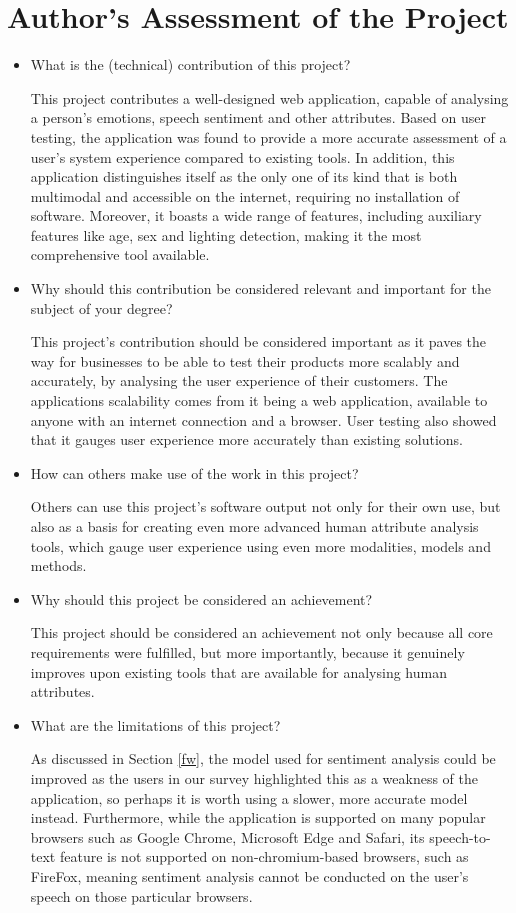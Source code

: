 \documentclass[12pt, a4paper]{article}
\newcommand{\np}
    {
    \vskip 0.4cm
    }
\begin{document}
\section{Author's Assessment of the Project}

\begin{itemize}
    \item What is the (technical) contribution of this project?
    \np
    This project contributes a well-designed web application, capable of analysing a person's emotions, speech sentiment and other attributes. Based on user testing, the application was found to provide a more accurate assessment of a user's system experience compared to existing tools. In addition, this application distinguishes itself as the only one of its kind that is both multimodal and accessible on the internet, requiring no installation of software. Moreover, it boasts a wide range of features, including auxiliary features like age, sex and lighting detection, making it the most comprehensive tool available.

    \item Why should this contribution be considered relevant and important for the subject of your degree?
    \np
    This project's contribution should be considered important as it paves the way for businesses to be able to test their products more scalably and accurately, by analysing the user experience of their customers. The applications scalability comes from it being a web application, available to anyone with an internet connection and a browser. User testing also showed that it gauges user experience more accurately than existing solutions.

    \item How can others make use of the work in this project?
    \np
    Others can use this project's software output not only for their own use, but also as a basis for creating even more advanced human attribute analysis tools, which gauge user experience using even more modalities, models and methods. 

    \item Why should this project be considered an achievement?
    \np
    This project should be considered an achievement not only because all core requirements were fulfilled, but more importantly, because it genuinely improves upon existing tools that are available for analysing human attributes.  
    
    \item What are the limitations of this project?
    \np
    As discussed in Section \ref{fw}, the model used for sentiment analysis could be improved as the users in our survey highlighted this as a weakness of the application, so perhaps it is worth using a slower, more accurate model instead. Furthermore, while the application is supported on many popular browsers such as Google Chrome, Microsoft Edge and Safari, its speech-to-text feature is not supported on non-chromium-based browsers, such as FireFox, meaning sentiment analysis cannot be conducted on the user's speech on those particular browsers.

\end{itemize}
\end{document}
